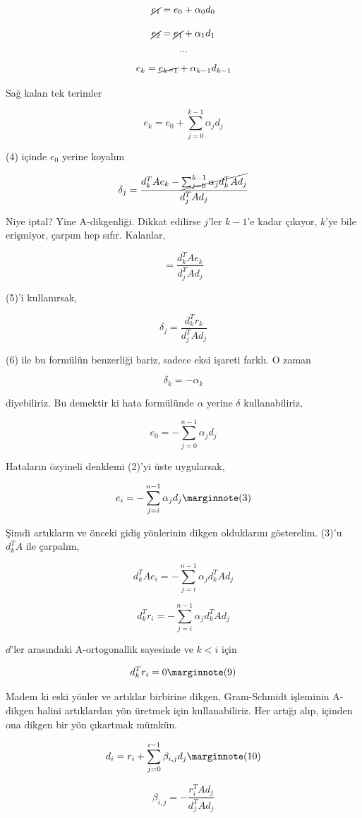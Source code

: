 \documentclass[12pt,fleqn]{article}\usepackage{../../common}
\begin{document}
$$ \cancel{e_{1}} = e_0 + \alpha_0 d_0$$

$$ \cancel{e_{2}} = \cancel{e_1} + \alpha_1 d_1$$

$$ ... $$

$$ e_{k} = \cancel{e_{k-1}} + \alpha_{k-1} d_{k-1}$$

Sağ kalan tek terimler 

$$ e_k = e_0 + \sum_{ j=0}^{k-1} \alpha_j d_j $$

(4) içinde $e_0$ yerine koyalım

$$ \delta_j = \frac{ d_k^T A e_k - \cancel{\sum_{ j=0}^{k-1} \alpha_j d_k^T A d_j}}
{ d_j^T A d_j } 
$$

Niye iptal? Yine A-dikgenliği. Dikkat edilirse $j$'ler $k-1$'e kadar
çıkıyor, $k$'ye bile erişmiyor, çarpım hep sıfır. Kalanlar,

$$  = \frac{ d_k^T A e_k}
{ d_j^T A d_j } 
$$

(5)'i kullanırsak, 

$$ \delta_j = \frac{ d_k^T r_k}
{ d_j^T A d_j } 
$$


(6) ile bu formülün benzerliği bariz, sadece eksi işareti farklı. O zaman 

$$ \delta_k = -\alpha_k $$

diyebiliriz. Bu demektir ki hata formülünde $\alpha$ yerine $\delta$
kullanabiliriz, 

$$ e_0 = -\sum_{ j=0}^{n-1} \alpha_j d_j $$

Hataların özyineli denklemi (2)'yi üste uygularsak, 

$$ e_i = -\sum_{ j=i}^{n-1} \alpha_j d_j 
\mlabel{3}
$$

Şimdi artıkların ve önceki gidiş yönlerinin dikgen olduklarını
gösterelim. (3)'u $d_k^TA$ ile çarpalım, 

$$ d_k^TAe_i = -\sum_{ j=i}^{n-1} \alpha_j  d_k^TAd_j 
$$

$$ d_k^Tr_i = -\sum_{ j=i}^{n-1} \alpha_j  d_k^TAd_j 
$$

$d$'ler arasındaki A-ortogonallik sayesinde ve $k < i$ için 

$$ d_k^Tr_i = 0
\mlabel{9}
$$

Madem ki eski yönler ve artıklar birbirine dikgen, Gram-Schmidt
işleminin A-dikgen halini artıklardan yön üretmek için
kullanabiliriz. Her artığı alıp, içinden ona dikgen bir yön çıkartmak
mümkün.

$$ d_i = r_i + \sum_{ j=0}^{i-1} \beta_{i,j}d_j 
\mlabel{10}
$$

$$ \beta_{i,j} = - \frac{ r_i^TAd_j}{d_j^TAd_j} $$
\end{document}
